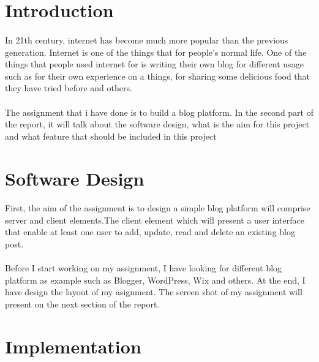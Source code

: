 \documentclass[10pt, a4paper]{article}
\title{\mytitle}
\author{\myauthor\hspace{1em}\\\contact\\Edinburgh Napier University\hspace{0.5em}-\hspace{0.5em}\mymodule}
\date{}
\begin{document}
	\maketitle
	
	\section{Introduction}
	\paragraph{}
	In 21th century, internet has become much more popular than the previous generation. Internet is one of the things that for people's normal life. One of the things that people used internet for is writing their own blog for different usage such as for their own experience on a things, for sharing some delicious food that they have tried before and others.
    \paragraph{}
    The assignment that i have done is to build a blog platform. In the second part of the report, it will talk about the software design, what is the aim for this project and what feature that should be included in this project
    
	\section{Software Design}
	\paragraph{}
	 First, the aim of the assignment is to design a simple blog platform will comprise server and client elements.The client element which will present a user interface that enable at least one user to add, update, read and delete an existing blog post.
	\paragraph{}
	 Before I start working on my assignment, I have looking for different blog platform as example such as Blogger,  WordPress, Wix and others. At the end, I have design the layout of my asignment. The screen shot of my assignment will present on the next section of the report.

	\section{Implementation}
\end{document}
